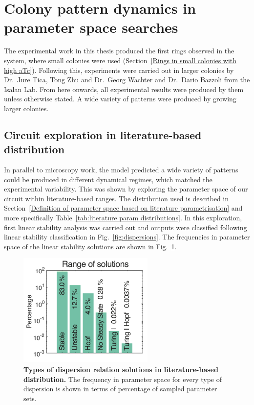 \section{Colony pattern dynamics in parameter space searches}

The experimental work in this thesis produced the first rings observed in the system, where small colonies were used (Section~\ref{Rings in small colonies with high aTc}).
Following this, experiments were carried out in larger colonies by Dr.~Jure Tica, Tong Zhu and Dr.~Georg Wachter and Dr.~Dario Bazzoli from the Isalan Lab.
From here onwards, all experimental results were produced by them unless otherwise stated.
A wide variety of patterns were produced by growing larger colonies.


\subsection{Circuit exploration in literature-based distribution}
In parallel to microscopy work, the model predicted a wide variety of patterns could be produced in different dynamical regimes, which matched the experimental variability.
This was shown by exploring the parameter space of our circuit within literature-based ranges.
The distribution used is described in Section~\ref{Definition of parameter space based on literature parametrisation} and more specifically Table~\ref{tab:literature param distributions}.
In this exploration, first linear stability analysis was carried out and outputs were classified following linear stability classification in Fig.~\ref{fig:dispersions}.
The frequencies in parameter space of the linear stability solutions are shown in Fig.~\ref{system_class_frequencies}.
\begin{figure}[H]
    \centering

    \includegraphics[width=0.6\textwidth]{chapters/Chapter 3/system_class_frequencies}
    \caption{\textbf{Types of dispersion relation solutions in literature-based distribution.} The frequency in parameter space for every type of dispersion is shown in terms of percentage of sampled parameter sets.}
    \label{system_class_frequencies}
\end{figure}

